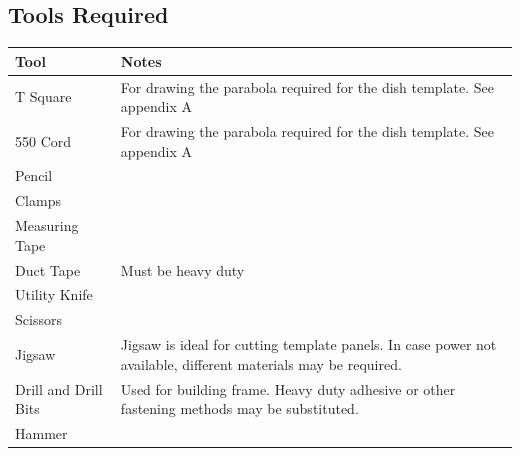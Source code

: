 \documentclass[titlepage]{article}
\begin{document}
        \subsection{Tools Required}
            \begin{table}[h!]
                \begin{tabular}{|p{3cm}|p{14cm}|}
                \hline
                \rowcolor[HTML]{C0C0C0} 
                Tool                 & Notes                                                                                                           \\ \hline
                T Square             & For drawing the parabola required for the dish template.  See appendix A                                        \\ \hline
                550 Cord             & For drawing the parabola required for the dish template.  See appendix A                                        \\ \hline
                Pencil               &                                                                                                                 \\ \hline
                Clamps               &                                                                                                                 \\ \hline
                Measuring Tape       &                                                                                                                 \\ \hline
                Duct Tape            & Must be heavy duty                                                                                              \\ \hline
                Utility Knife        &                                                                                                                 \\ \hline
                Scissors             &                                                                                                                 \\ \hline
                Jigsaw               & Jigsaw is ideal for cutting template panels.  In case power not available, different materials may be required. \\ \hline
                Drill and Drill Bits & Used for building frame.  Heavy duty adhesive or other fastening methods may be substituted.                    \\ \hline
                Hammer               &                                                                                                                 \\ \hline
                \end{tabular}
                \end{table}
        
\end{document}
